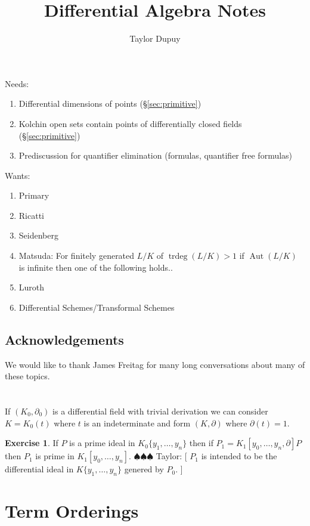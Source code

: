 \documentclass[]{article}
\title{Differential Algebra Notes}
\author{Taylor Dupuy }
\newcommand{\taylor}[1]{{\color{blue} \sf $\spadesuit\spadesuit\spadesuit$ Taylor: [#1]}}
\numberwithin{equation}{section}
\theoremstyle{definition}
\newtheorem{exercise}[theorem]{Exercise}
\theoremstyle{remark}
\newcommand{\trdeg}{\operatorname{trdeg}}
\newcommand{\Aut}{\operatorname{Aut}}
\begin{document}
\maketitle

\noindent Needs:
\begin{enumerate}
	\item Differential dimensions of points (\S\ref{sec:primitive})
	\item Kolchin open sets contain points of differentially closed fields (\S\ref{sec:primitive})
	\item Prediscussion for quantifier elimination (formulas, quantifier free formulas)
\end{enumerate}
\noindent 
Wants:
\begin{enumerate}
	\item Primary 
	\item Ricatti
	\item Seidenberg
	\item Matsuda: For finitely generated $L/K$ of $\trdeg(L/K)>1$ if $\Aut(L/K)$ is infinite then one of the following holds..
	\item Luroth
	\item Differential Schemes/Transformal Schemes
\end{enumerate}

\subsection*{Acknowledgements}
We would like to thank James Freitag for many long conversations about many of these topics. 


\section{}
If $(K_0,\partial_0)$ is a differential field with trivial derivation we can consider $K=K_0(t)$ where $t$ is an indeterminate and form $(K,\partial)$ where $\partial(t)=1$. 

\begin{exercise}
	If $P$ is a prime ideal in $K_0\lbrace y_1,\ldots,y_n\rbrace$ then if $P_1=K_1[y_0,\ldots,y_n,\partial] P$ then $P_1$ is prime in $K_1[y_0,\ldots,y_n]$.
	\taylor{
$P_1$ is intended to be the differential ideal in $K\lbrace y_1,\ldots,y_n\rbrace$ genered by $P_0$.	
} 
\end{exercise}


\section{Term Orderings}
\end{document}
